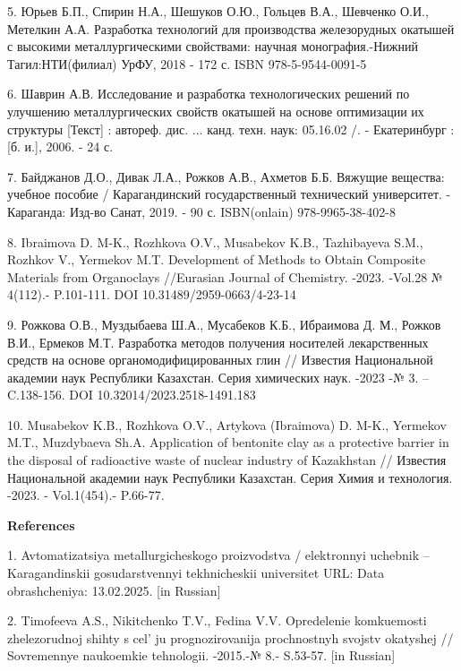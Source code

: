 5. Юрьев Б.П., Спирин Н.А., Шешуков О.Ю., Гольцев В.А., Шевченко О.И.,
Метелкин А.А. Разработка технологий для производства железорудных
окатышей с высокими металлургическими свойствами: научная
монография.-Нижний Тагил:НТИ(филиал) УрФУ, 2018 - 172 с. ISBN
978-5-9544-0091-5

6. Шаврин А.В. Исследование и разработка технологических решений по
улучшению металлургических свойств окатышей на основе оптимизации их
структуры {[}Текст{]} : автореф. дис. ... канд. техн. наук: 05.16.02 /.
- Екатеринбург : {[}б. и.{]}, 2006. - 24 с.

7. Байджанов Д.О., Дивак Л.А., Рожков А.В., Ахметов Б.Б. Вяжущие
вещества: учебное пособие / Карагандинский государственный технический
университет. - Караганда: Изд-во Санат, 2019. - 90 с. ISBN(onlain)
978-9965-38-402-8

8. Ibraimova D. M-K., Rozhkova O.V., Musabekov K.B., Tazhibayeva S.M.,
Rozhkov V., Yermekov M.T. Development of Methods to Obtain Composite
Materials from Organoclays //Eurasian Journal of Chemistry. -2023.
-Vol.28 № 4(112).- P.101-111. DOI 10.31489/2959-0663/4-23-14

9. Рожкова О.В., Муздыбаева Ш.А., Мусабеков К.Б., Ибраимова Д. М., Рожков
В.И., Ермеков М.Т. Разработка методов получения носителей лекарственных
средств на основе органомодифицированных глин // Известия Национальной
академии наук Республики Казахстан. Серия химических наук. -2023 -№ 3.
-- C.138-156. DOI 10.32014/2023.2518-1491.183

10. Musabekov K.B., Rozhkova O.V., Artykova (Ibraimova) D. M-K., Yermekov
M.T., Muzdybaeva Sh.A. Application of bentonite clay as a protective
barrier in the disposal of radioactive waste of nuclear industry of
Kazakhstan // Известия Национальной академии наук Республики Казахстан.
Серия Химия и технология. -2023. - Vol.1(454).- P.66-77.
\href{https://doi.org/10.32014/2023.2518-1491.148}{}

{\bfseries References}

1. Avtomatizatsiya metallurgicheskogo proizvodstva / elektronnyi uchebnik
-- Karagandinskii gosudarstvennyi tekhnicheskii universitet URL:
\href{https://www.kstu.kz/wp-content/uploads/2018/05/tsifrovaya-mitallurgiya/el-uch-po-ampr/index.htm-}{}
Data obrashcheniya: 13.02.2025. {[}in Russian{]}

2. Timofeeva A.S., Nikitchenko T.V., Fedina V.V. Opredelenie komkuemosti
zhelezorudnoj shihty s cel' ju prognozirovanija
prochnostnyh svojstv okatyshej // Sovremennye naukoemkie tehnologii.
-2015.-№ 8.- S.53-57. {[}in Russian{]}


